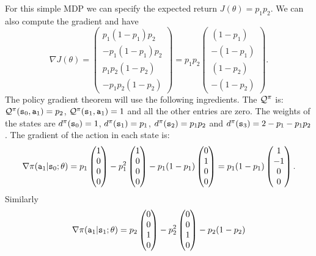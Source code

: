 \begin{example}
For this simple MDP we can specify the expected return
$J(\theta)=p_1p_2$. We can also compute the gradient and have
\[
\nabla J(\theta)=\begin{pmatrix}p_1(1-p_1)p_2\\
-p_1(1-p_1)p_2 \\  p_1 p_2 (1-p_2) \\ -p_1 p_2 (1-p_2)\end{pmatrix}= p_1 p_2\begin{pmatrix}(1-p_1)\\
-(1-p_1) \\  (1-p_2) \\ - (1-p_2)\end{pmatrix}.
\]
The policy gradient theorem will use the following ingredients. The
$\mathcal{Q}^\pi$ is: $\mathcal{Q}^\pi({\tt s}_0,{\tt a}_1)=p_2$,
$\mathcal{Q}^\pi({\tt s}_1,{\tt a}_1)=1$ and all the other entries are
zero. The weights of the states are $d^{\pi}({\tt s}_0)=1$,
$d^{\pi}({\tt s}_1)=p_1$, $d^{\pi}({\tt s}_2)=p_1 p_2$ and
$d^{\pi}({\tt s}_3)=2-p_1-p_1 p_2$. The gradient of the action in each
state is:
\[
\nabla \pi({\tt a}_1|{\tt s}_0;\theta)=
p_1\begin{pmatrix}1\\0\\0\\0\end{pmatrix} - p^2_1
\begin{pmatrix}1\\0\\0\\0\end{pmatrix} - p_1(1-p_1)
\begin{pmatrix}0\\1\\0\\0\end{pmatrix} = p_1(1-p_1)\begin{pmatrix}1\\-1\\0\\0\end{pmatrix}.
\]
Similarly
\[
\nabla \pi({\tt a}_1|{\tt s}_1;\theta)=
p_2\begin{pmatrix}0\\0\\1\\0\end{pmatrix} - p_2^2
\begin{pmatrix}0\\0\\1\\0\end{pmatrix} - p_2(1-p_2)
\]
\end{example}
